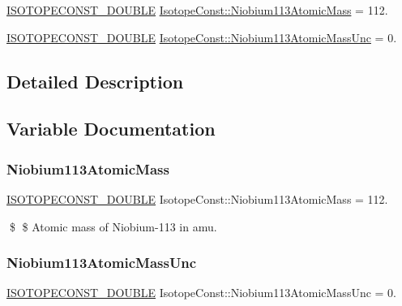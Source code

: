 \begin{DoxyCompactItemize}
\item 
\mbox{\hyperlink{group___isotope_const-_macros_ga8f45a7272ce02c0b4c65c44636ed719a}{I\+S\+O\+T\+O\+P\+E\+C\+O\+N\+S\+T\+\_\+\+D\+O\+U\+B\+LE}} \mbox{\hyperlink{group___isotope_const-_niobium-_nb113_ga8126bdaf6eb2d455c8008dd909b32a2c}{Isotope\+Const\+::\+Niobium113\+Atomic\+Mass}} = 112.
\item 
\mbox{\hyperlink{group___isotope_const-_macros_ga8f45a7272ce02c0b4c65c44636ed719a}{I\+S\+O\+T\+O\+P\+E\+C\+O\+N\+S\+T\+\_\+\+D\+O\+U\+B\+LE}} \mbox{\hyperlink{group___isotope_const-_niobium-_nb113_gadc6f94611270735e9c4997367201d446}{Isotope\+Const\+::\+Niobium113\+Atomic\+Mass\+Unc}} = 0.
\end{DoxyCompactItemize}


\subsection{Detailed Description}


\subsection{Variable Documentation}
\mbox{\label{group___isotope_const-_niobium-_nb113_ga8126bdaf6eb2d455c8008dd909b32a2c}} 
\subsubsection{\texorpdfstring{Niobium113\+Atomic\+Mass}{Niobium113AtomicMass}}
{\footnotesize\ttfamily \mbox{\hyperlink{group___isotope_const-_macros_ga8f45a7272ce02c0b4c65c44636ed719a}{I\+S\+O\+T\+O\+P\+E\+C\+O\+N\+S\+T\+\_\+\+D\+O\+U\+B\+LE}} Isotope\+Const\+::\+Niobium113\+Atomic\+Mass = 112.}

\$ \$ Atomic mass of Niobium-\/113 in amu. \mbox{\label{group___isotope_const-_niobium-_nb113_gadc6f94611270735e9c4997367201d446}} 
\subsubsection{\texorpdfstring{Niobium113\+Atomic\+Mass\+Unc}{Niobium113AtomicMassUnc}}
{\footnotesize\ttfamily \mbox{\hyperlink{group___isotope_const-_macros_ga8f45a7272ce02c0b4c65c44636ed719a}{I\+S\+O\+T\+O\+P\+E\+C\+O\+N\+S\+T\+\_\+\+D\+O\+U\+B\+LE}} Isotope\+Const\+::\+Niobium113\+Atomic\+Mass\+Unc = 0.}

